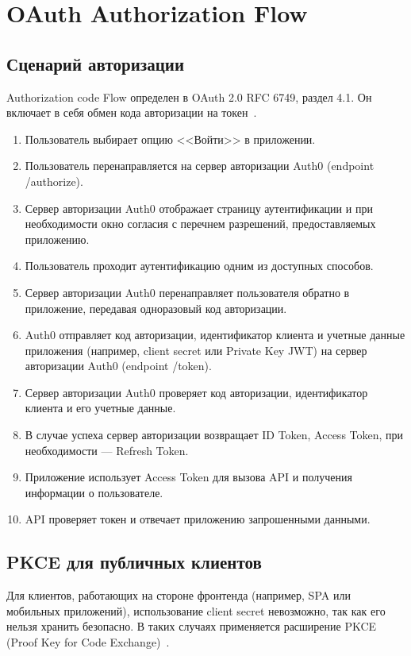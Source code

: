 \section{OAuth Authorization Flow}

\subsection{Сценарий авторизации}
Authorization code Flow определен в OAuth 2.0 RFC 6749, раздел 4.1. Он включает в себя обмен кода авторизации на \mbox{токен \cite{oauth}.} 
\begin{enumerate}
	\item Пользователь выбирает опцию <<Войти>> в приложении.
	\item Пользователь перенаправляется на сервер авторизации Auth0 (endpoint /authorize).
	\item Сервер авторизации Auth0 отображает страницу аутентификации и при необходимости окно согласия с перечнем разрешений, предоставляемых приложению.
	\item Пользователь проходит аутентификацию одним из доступных способов.
	\item Сервер авторизации Auth0 перенаправляет пользователя обратно в приложение, передавая одноразовый код авторизации.
	\item Auth0 отправляет код авторизации, идентификатор клиента и учетные данные приложения (например, client secret или Private Key JWT) на сервер авторизации Auth0 (endpoint /token).
	\item Сервер авторизации Auth0 проверяет код авторизации, идентификатор клиента и его учетные данные.
	\item В случае успеха сервер авторизации возвращает ID Token, Access Token, при необходимости --- Refresh Token.
	\item Приложение использует Access Token для вызова API и получения информации о пользователе.
	\item API проверяет токен и отвечает приложению запрошенными данными.
\end{enumerate}

\subsection{PKCE для публичных клиентов}
Для клиентов, работающих на стороне фронтенда (например, SPA или мобильных приложений), использование client secret невозможно, так как его нельзя хранить безопасно.  
В таких случаях применяется расширение PKCE (Proof Key for Code \mbox{Exchange) \cite{pkce}.}

